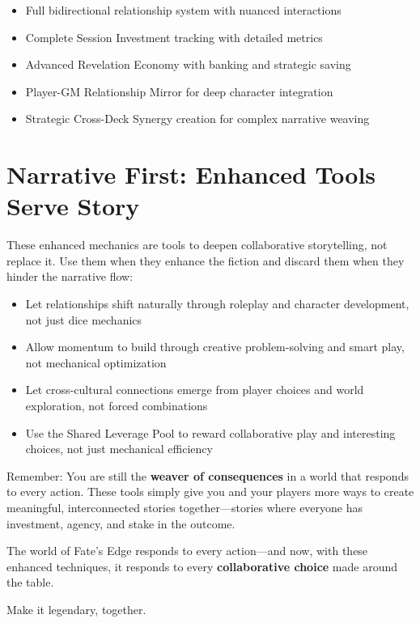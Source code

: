 \begin{itemize}
    \item Full bidirectional relationship system with nuanced interactions
    \item Complete Session Investment tracking with detailed metrics
    \item Advanced Revelation Economy with banking and strategic saving
    \item Player-GM Relationship Mirror for deep character integration
    \item Strategic Cross-Deck Synergy creation for complex narrative weaving
\end{itemize}

\section*{Narrative First: Enhanced Tools Serve Story}

These enhanced mechanics are tools to deepen collaborative storytelling, not replace it. Use them when they enhance the fiction and discard them when they hinder the narrative flow:

\begin{itemize}
    \item Let relationships shift naturally through roleplay and character development, not just dice mechanics
    \item Allow momentum to build through creative problem-solving and smart play, not mechanical optimization
    \item Let cross-cultural connections emerge from player choices and world exploration, not forced combinations
    \item Use the Shared Leverage Pool to reward collaborative play and interesting choices, not just mechanical efficiency
\end{itemize}

Remember: You are still the \textbf{weaver of consequences} in a world that responds to every action. These tools simply give you and your players more ways to create meaningful, interconnected stories together—stories where everyone has investment, agency, and stake in the outcome.

The world of Fate's Edge responds to every action---and now, with these enhanced techniques, it responds to every \textbf{collaborative choice} made around the table.

Make it legendary, together.


